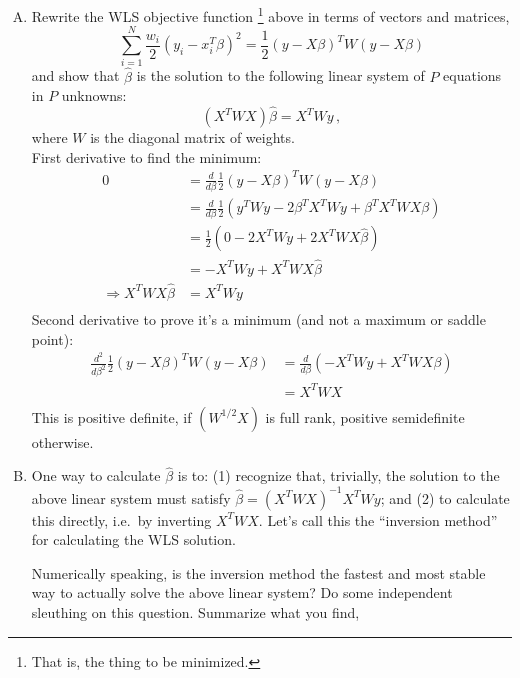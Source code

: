 \documentclass{article}
\begin{document}
\begin{enumerate}[(A)]
\item Rewrite the WLS objective function \footnote{That is, the thing to be minimized.} above in terms of vectors and matrices, \\
\color{blue}
	 $$ \sum_{i=1}^N \frac{w_i}{2}(y_i - x_i^T \beta)^2  = \frac{1}{2} (y- X\beta)^T W  (y- X\beta) $$
\color{black}
and show that $\hat \beta$ is the solution to the following linear system of $P$ equations in $P$ unknowns:
$$
(X^T W X) \hat \beta = X^T W y \, ,
$$
where $W$ is the diagonal matrix of weights. 
\\

\color{blue}
	First derivative to find the minimum: 
	\begin{align*}
		0 & = \frac{d}{d\beta} \frac{1}{2} (y- X\beta)^T W  (y- X\beta) \\
		& = \frac{d}{d\beta} \frac{1}{2}  \left( y^T Wy - 2 \beta^TX^T Wy + \beta^TX^T W X\beta \right) \\
		& =  \frac{1}{2} \left( 0 - 2 X^T Wy + 2 X^T W X\hat\beta  \right) \\
		& =- X^T Wy +  X^T W X\hat\beta   \\
		\Rightarrow X^T W X\hat\beta & =  X^T Wy     \\
	\end{align*}
	Second derivative to prove it's a minimum (and not a maximum or saddle point): 
	\begin{align*}
		 \frac{d^2}{d\beta^2} \frac{1}{2} (y- X\beta)^T W  (y- X\beta) 
		& = \frac{d}{d\beta} \left( -  X^T Wy +  X^T W X\beta  \right)\\
		& = X^T W X  \\
	\end{align*}
	This is positive definite, if $ ( W^{1/2} X)$ is full rank, positive semidefinite otherwise. \\
\color{black}

\item One way to calculate $\hat{\beta}$ is to: (1) recognize that, trivially, the solution to the above linear system must satisfy $\hat \beta = (X^T W X)^{-1} X^T W y$; and (2) to calculate this directly, i.e.~by inverting $X^T W X$.  Let's call this the ``inversion method'' for calculating the WLS solution.

Numerically speaking, is the inversion method the fastest and most stable way to actually solve the above linear system?  Do some independent sleuthing on this question.  Summarize what you find, 


\end{enumerate}
\end{document}

